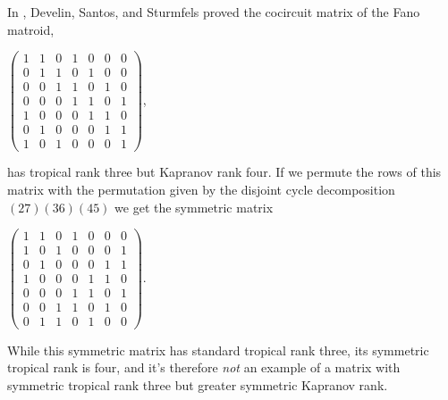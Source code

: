 \documentclass{article}
\begin{document}
In \cite{dss}, Develin, Santos, and Sturmfels proved the cocircuit matrix of the Fano matroid,
\begin{center}
  $\left(\begin{array}{ccccccc} 1 & 1 & 0 & 1 & 0 & 0 & 0 \\ 0 & 1 & 1 & 0 & 1 & 0 & 0 \\ 0 & 0 & 1 & 1 & 0 & 1 & 0 \\ 0 & 0 & 0 & 1 & 1 & 0 & 1 \\ 1 & 0 & 0 & 0 & 1 & 1 & 0 \\ 0 & 1 & 0 & 0 & 0 & 1 & 1 \\ 1 & 0 & 1 & 0 & 0 & 0 & 1 \end{array}\right)$,
\end{center}
has tropical rank three but Kapranov rank four. If we permute the rows of this matrix with the permutation given by the disjoint cycle decomposition $(27)(36)(45)$ we get the symmetric matrix
\begin{center}  
  $\left(\begin{array}{ccccccc} 1 & 1 & 0 & 1 & 0 & 0 & 0 \\ 1 & 0 & 1 & 0 & 0 & 0 & 1 \\ 0 & 1 & 0 & 0 & 0 & 1 & 1 \\ 1 & 0 & 0 & 0 & 1 & 1 & 0 \\ 0 & 0 & 0 & 1 & 1 & 0 & 1 \\ 0 & 0 & 1 & 1 & 0 & 1 & 0 \\ 0 & 1 & 1 & 0 & 1 & 0 & 0 \end{array}\right)$.
\end{center}
While this symmetric matrix has standard tropical rank three, its symmetric tropical rank is four, and it's therefore \emph{not} an example of a matrix with symmetric tropical rank three but greater symmetric Kapranov rank.
\end{document}
